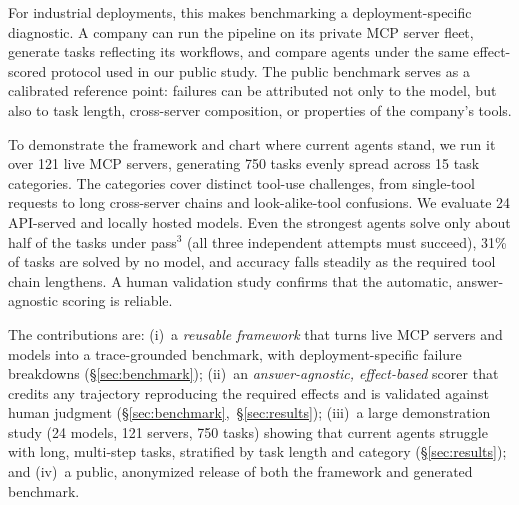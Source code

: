 For industrial deployments, this makes benchmarking a deployment-specific
diagnostic. A company can run the pipeline on its private MCP server fleet,
generate tasks reflecting its workflows, and compare agents under the same
effect-scored protocol used in our public study. The public benchmark serves
as a calibrated reference point: failures can be attributed not only to the
model, but also to task length, cross-server composition, or properties of the
company's tools.

To demonstrate the framework and chart where current agents stand, we run it
over 121 live MCP servers, generating 750 tasks evenly spread across 15 task
categories. The categories cover distinct tool-use challenges, from single-tool
requests to long cross-server chains and look-alike-tool confusions. We evaluate
24 API-served and locally hosted models. Even the strongest agents solve only
about half of the tasks under pass$^3$ (all three independent attempts must
succeed), 31\% of tasks are solved by no model, and accuracy falls steadily as
the required tool chain lengthens. A human validation study confirms that the
automatic, answer-agnostic scoring is reliable.

The contributions are: (i)~a \emph{reusable framework} that turns live MCP
servers and models into a trace-grounded benchmark, with deployment-specific
failure breakdowns (\S\ref{sec:benchmark}); (ii)~an \emph{answer-agnostic,
effect-based} scorer that credits any trajectory reproducing the required
effects and is validated against human judgment
(\S\ref{sec:benchmark},~\S\ref{sec:results}); (iii)~a large demonstration
study (24 models, 121 servers, 750 tasks) showing that current agents struggle
with long, multi-step tasks, stratified by task length and category
(\S\ref{sec:results}); and (iv)~a public, anonymized release of both the
framework and generated benchmark.
